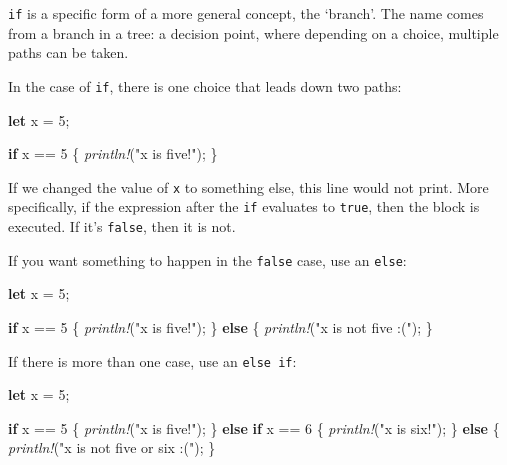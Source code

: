 \documentclass[a4paper,]{book}
\newenvironment{Shaded}{\begin{snugshade}}{\end{snugshade}}
\newcommand{\KeywordTok}[1]{\textcolor[rgb]{0.13,0.29,0.53}{\textbf{{#1}}}}
\newcommand{\DecValTok}[1]{\textcolor[rgb]{0.00,0.00,0.81}{{#1}}}
\newcommand{\StringTok}[1]{\textcolor[rgb]{0.31,0.60,0.02}{{#1}}}
\newcommand{\PreprocessorTok}[1]{\textcolor[rgb]{0.56,0.35,0.01}{\textit{{#1}}}}
\newcommand{\NormalTok}[1]{{#1}}
\begin{document}
\texttt{if} is a specific form of a more general concept, the `branch'.
The name comes from a branch in a tree: a decision point, where
depending on a choice, multiple paths can be taken.

In the case of \texttt{if}, there is one choice that leads down two
paths:

\begin{Shaded}
\begin{Highlighting}[]
\KeywordTok{let} \NormalTok{x = }\DecValTok{5}\NormalTok{;}

\KeywordTok{if} \NormalTok{x == }\DecValTok{5} \NormalTok{\{}
    \PreprocessorTok{println!}\NormalTok{(}\StringTok{"x is five!"}\NormalTok{);}
\NormalTok{\}}
\end{Highlighting}
\end{Shaded}

If we changed the value of \texttt{x} to something else, this line would
not print. More specifically, if the expression after the \texttt{if}
evaluates to \texttt{true}, then the block is executed. If it's
\texttt{false}, then it is not.

If you want something to happen in the \texttt{false} case, use an
\texttt{else}:

\begin{Shaded}
\begin{Highlighting}[]
\KeywordTok{let} \NormalTok{x = }\DecValTok{5}\NormalTok{;}

\KeywordTok{if} \NormalTok{x == }\DecValTok{5} \NormalTok{\{}
    \PreprocessorTok{println!}\NormalTok{(}\StringTok{"x is five!"}\NormalTok{);}
\NormalTok{\} }\KeywordTok{else} \NormalTok{\{}
    \PreprocessorTok{println!}\NormalTok{(}\StringTok{"x is not five :("}\NormalTok{);}
\NormalTok{\}}
\end{Highlighting}
\end{Shaded}

If there is more than one case, use an \texttt{else\ if}:

\begin{Shaded}
\begin{Highlighting}[]
\KeywordTok{let} \NormalTok{x = }\DecValTok{5}\NormalTok{;}

\KeywordTok{if} \NormalTok{x == }\DecValTok{5} \NormalTok{\{}
    \PreprocessorTok{println!}\NormalTok{(}\StringTok{"x is five!"}\NormalTok{);}
\NormalTok{\} }\KeywordTok{else} \KeywordTok{if} \NormalTok{x == }\DecValTok{6} \NormalTok{\{}
    \PreprocessorTok{println!}\NormalTok{(}\StringTok{"x is six!"}\NormalTok{);}
\NormalTok{\} }\KeywordTok{else} \NormalTok{\{}
    \PreprocessorTok{println!}\NormalTok{(}\StringTok{"x is not five or six :("}\NormalTok{);}
\NormalTok{\}}
\end{Highlighting}
\end{Shaded}
\end{document}
